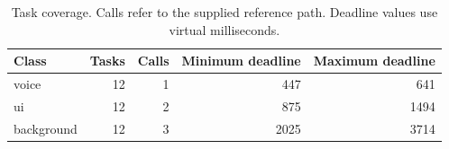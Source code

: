 \begin{table}[htbp]
\centering\small
\caption{Task coverage. Calls refer to the supplied reference path. Deadline values use virtual milliseconds.}\label{tab:coverage}
\begin{tabular}{lrrrr}\toprule
Class & Tasks & Calls & Minimum deadline & Maximum deadline \\\midrule
voice & 12 & 1 & 447 & 641 \\
ui & 12 & 2 & 875 & 1494 \\
background & 12 & 3 & 2025 & 3714 \\\bottomrule
\end{tabular}
\end{table}
